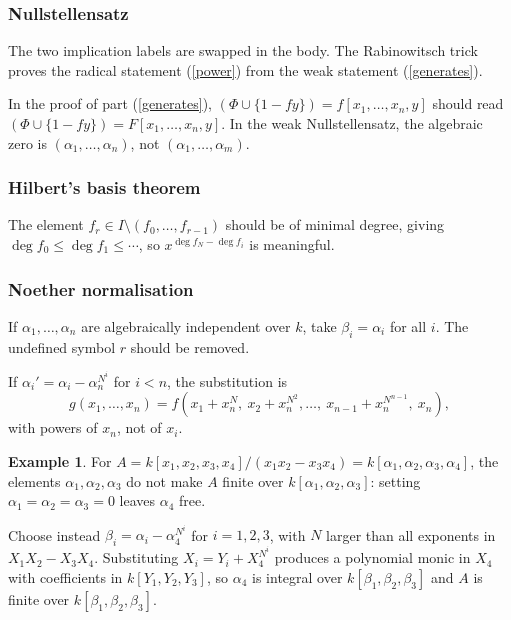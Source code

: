 \documentclass[12pt]{article}
\theoremstyle{plain}
\theoremstyle{definition}
\newtheorem{example}[thm]{Example}
\begin{document}
\subsubsection*{Nullstellensatz}

The two implication labels are swapped in the body. The Rabinowitsch trick proves the radical statement (\ref{power}) from the weak statement (\ref{generates}).

In the proof of part (\ref{generates}), $(\Phi\cup\{1-fy\})=f[x_1,\ldots,x_n,y]$ should read $(\Phi\cup\{1-fy\})=F[x_1,\ldots,x_n,y]$. In the weak Nullstellensatz, the algebraic zero is $(\alpha_1,\ldots,\alpha_n)$, not $(\alpha_1,\ldots,\alpha_m)$.

\subsubsection*{Hilbert's basis theorem}

The element $f_r\in I\setminus(f_0,\ldots,f_{r-1})$ should be of minimal degree, giving $\deg f_0\le\deg f_1\le\cdots$, so $x^{\deg f_N-\deg f_i}$ is meaningful.

\subsubsection*{Noether normalisation}

If $\alpha_1,\ldots,\alpha_n$ are algebraically independent over $k$, take $\beta_i=\alpha_i$ for all $i$. The undefined symbol $r$ should be removed.

If $\alpha_i'=\alpha_i-\alpha_n^{N^i}$ for $i<n$, the substitution is
\[
g(x_1,\ldots,x_n)=f(x_1+x_n^N,\ x_2+x_n^{N^2},\ldots,\ x_{n-1}+x_n^{N^{n-1}},\ x_n),
\]
with powers of $x_n$, not of $x_i$.

\begin{example}\label{ex:noether_corr}
For $A=k[x_1,x_2,x_3,x_4]/(x_1x_2-x_3x_4)=k[\alpha_1,\alpha_2,\alpha_3,\alpha_4]$, the elements $\alpha_1,\alpha_2,\alpha_3$ do not make $A$ finite over $k[\alpha_1,\alpha_2,\alpha_3]$: setting $\alpha_1=\alpha_2=\alpha_3=0$ leaves $\alpha_4$ free.

Choose instead $\beta_i=\alpha_i-\alpha_4^{N^i}$ for $i=1,2,3$, with $N$ larger than all exponents in $X_1X_2-X_3X_4$. Substituting $X_i=Y_i+X_4^{N^i}$ produces a polynomial monic in $X_4$ with coefficients in $k[Y_1,Y_2,Y_3]$, so $\alpha_4$ is integral over $k[\beta_1,\beta_2,\beta_3]$ and $A$ is finite over $k[\beta_1,\beta_2,\beta_3]$.
\end{example}
\end{document}
